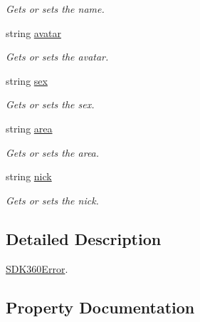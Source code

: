 \begin{DoxyCompactItemize}
\begin{DoxyCompactList}\small\item\em Gets or sets the name. \end{DoxyCompactList}\item 
string \mbox{\hyperlink{class_t_net_1_1_sns_1_1_login360___v2_1_1_s_d_k360_error_a046fbd616023e7459153960c31ec7f95}{avatar}}
\begin{DoxyCompactList}\small\item\em Gets or sets the avatar. \end{DoxyCompactList}\item 
string \mbox{\hyperlink{class_t_net_1_1_sns_1_1_login360___v2_1_1_s_d_k360_error_adf580ce90ad3fb63d3657882614af166}{sex}}
\begin{DoxyCompactList}\small\item\em Gets or sets the sex. \end{DoxyCompactList}\item 
string \mbox{\hyperlink{class_t_net_1_1_sns_1_1_login360___v2_1_1_s_d_k360_error_aa28c48baa0166d7b9c928be48fbfc933}{area}}
\begin{DoxyCompactList}\small\item\em Gets or sets the area. \end{DoxyCompactList}\item 
string \mbox{\hyperlink{class_t_net_1_1_sns_1_1_login360___v2_1_1_s_d_k360_error_ac3e95807785896f28137fad6d42dce88}{nick}}
\begin{DoxyCompactList}\small\item\em Gets or sets the nick. \end{DoxyCompactList}\end{DoxyCompactItemize}


\subsection{Detailed Description}
\mbox{\hyperlink{class_t_net_1_1_sns_1_1_login360___v2_1_1_s_d_k360_error}{S\+D\+K360\+Error}}. 



\subsection{Property Documentation}
\mbox{\label{class_t_net_1_1_sns_1_1_login360___v2_1_1_s_d_k360_error_aa28c48baa0166d7b9c928be48fbfc933}} 
